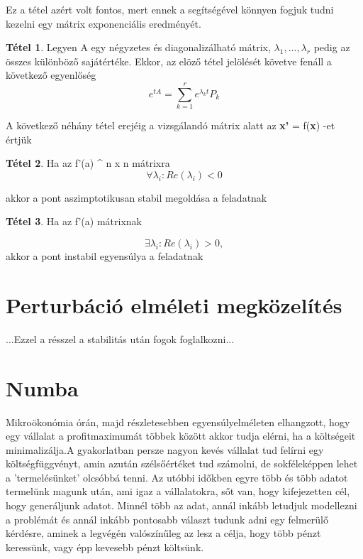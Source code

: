 \documentclass{article}
\theoremstyle{definition}
\theoremstyle{theorem}
\newtheorem{theorem}{Tétel}
\begin{document}
Ez a tétel azért volt fontos, mert ennek a segítségével könnyen fogjuk tudni kezelni egy mátrix exponenciális eredményét.

\begin{theorem}
Legyen A egy négyzetes és diagonalizálható mátrix, $\lambda_1,...,\lambda_r$ pedig az összes különböző sajátértéke. Ekkor, az elöző tétel jelölését követve fenáll a következő egyenlőség
\begin{equation*}
    e^{tA} = \sum_{k=1}^r e^{\lambda_k t} P_k
\end{equation*}
\end{theorem}
A következő néhány tétel erejéig a vizsgálandó mátrix alatt az \textbf{x'} = f(\textbf{x}) -et értjük
\begin{theorem}
Ha az f'(a) \in {} ^ {n x n} \;\;mátrixra \;\;
\begin{equation*}
    \forall \lambda_i : Re(\lambda_i) < 0
\end{equation*}

akkor a pont aszimptotikusan stabil megoldása a feladatnak
\end{theorem}

\begin{theorem}
Ha az f'(a) mátrixnak

\begin{equation*}
    \exists \lambda_i : Re(\lambda_i) > 0,
\end{equation*}
 akkor a pont instabil egyensúlya a feladatnak
\end{theorem}
\section{Perturbáció elméleti megközelítés}
...Ezzel a résszel a stabilitás után fogok foglalkozni...
\section{Numba}
Mikroökonómia órán, majd részletesebben egyensúlyelméleten elhangzott, hogy egy vállalat a profitmaximumát többek között akkor tudja elérni, ha a költségeit minimalizálja.A gyakorlatban persze nagyon kevés vállalat tud felírni egy költségfüggvényt, amin azután szélsőértéket tud számolni, de sokféleképpen lehet a 'termelésünket' olcsóbbá tenni. Az utóbbi időkben egyre több és több adatot termelünk magunk után, ami igaz a vállalatokra, sőt van, hogy kifejezetten cél, hogy generáljunk adatot. Minnél több az adat, annál inkább letudjuk modellezni a problémát és annál inkább pontosabb választ tudunk adni egy felmerülő kérdésre, aminek a legvégén valószínűleg az lesz a célja, hogy több pénzt keressünk, vagy épp kevesebb pénzt költsünk.
\end{document}

